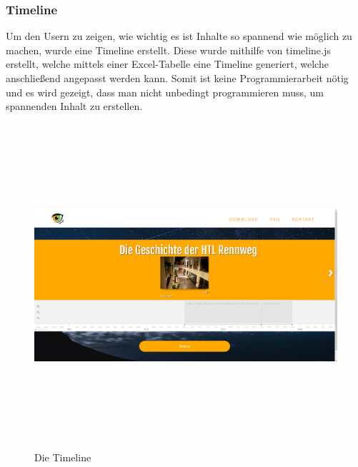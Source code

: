 \subsubsection{Timeline}
Um den Usern zu zeigen, wie wichtig es ist Inhalte so spannend wie möglich zu machen, wurde eine Timeline erstellt. Diese wurde mithilfe von timeline.js erstellt, welche mittels einer Excel-Tabelle eine Timeline generiert, welche anschließend angepasst werden kann. Somit ist keine Programmierarbeit nötig und es wird gezeigt, dass man nicht unbedingt programmieren muss, um spannenden Inhalt zu erstellen.
\begin{figure}[h]
	\centering
\includegraphics[width=12cm,height=12cm,keepaspectratio]{webseite_timeline} 
	\caption{Die Timeline}
\end{figure}
